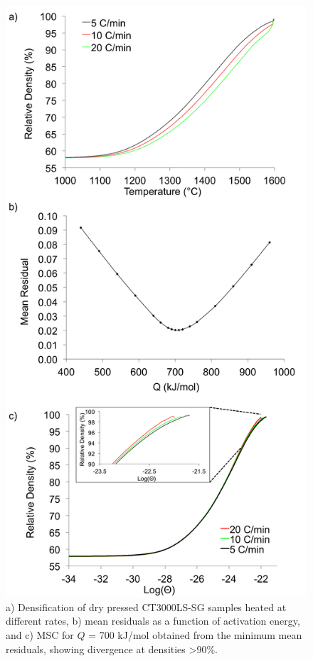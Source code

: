 \newpage
\begin{figure}[H]
	\centering
	\includegraphics{Chapter-6/Figures/Figure8.png}
	\caption{a) Densification of dry pressed CT3000LS-SG samples heated at different rates, b) mean residuals as a function of activation energy, and c) MSC for $Q$ = 700 kJ/mol obtained from the minimum mean residuals, showing divergence at densities >90\%. }
	\label{Ch6-figure:Figure8}
\end{figure}

